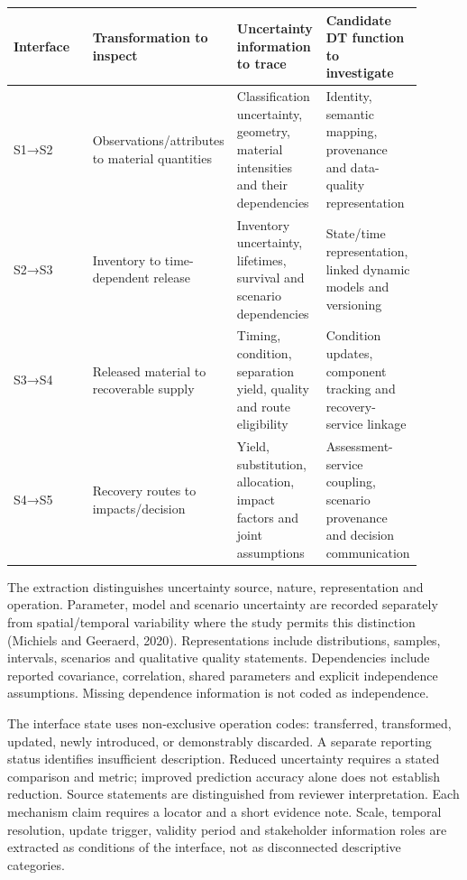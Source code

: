 \begin{longtable}{p{0.225\linewidth}p{0.225\linewidth}p{0.225\linewidth}p{0.225\linewidth}}
\toprule
Interface & Transformation to inspect & Uncertainty information to trace & Candidate DT function to investigate\\
\midrule
S1→S2 & Observations/attributes to material quantities & Classification uncertainty, geometry, material intensities and their dependencies & Identity, semantic mapping, provenance and data-quality representation\\
S2→S3 & Inventory to time-dependent release & Inventory uncertainty, lifetimes, survival and scenario dependencies & State/time representation, linked dynamic models and versioning\\
S3→S4 & Released material to recoverable supply & Timing, condition, separation yield, quality and route eligibility & Condition updates, component tracking and recovery-service linkage\\
S4→S5 & Recovery routes to impacts/decision & Yield, substitution, allocation, impact factors and joint assumptions & Assessment-service coupling, scenario provenance and decision communication\\
\bottomrule
\end{longtable}
The extraction distinguishes uncertainty source, nature, representation and operation. Parameter, model and scenario uncertainty are recorded separately from spatial/temporal variability where the study permits this distinction (Michiels and Geeraerd, 2020). Representations include distributions, samples, intervals, scenarios and qualitative quality statements. Dependencies include reported covariance, correlation, shared parameters and explicit independence assumptions. Missing dependence information is not coded as independence.

The interface state uses non-exclusive operation codes: transferred, transformed, updated, newly introduced, or demonstrably discarded. A separate reporting status identifies insufficient description. Reduced uncertainty requires a stated comparison and metric; improved prediction accuracy alone does not establish reduction. Source statements are distinguished from reviewer interpretation. Each mechanism claim requires a locator and a short evidence note. Scale, temporal resolution, update trigger, validity period and stakeholder information roles are extracted as conditions of the interface, not as disconnected descriptive categories.


